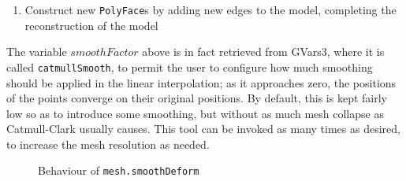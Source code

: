 \documentclass[a4paper,10pt]{article}
\begin{document}
\begin{itemize}
{\begin{enumerate}
\item{Construct new \texttt{PolyFace}s by adding new edges to the model, completing the reconstruction of the model}
\end{enumerate}

The variable $smoothFactor$ above is in fact retrieved from GVars3, where it is called \texttt{catmullSmooth}, to permit the user to configure how much smoothing should be applied in the linear interpolation; as it approaches zero, the positions of the points converge on their original positions. By default, this is kept fairly low so as to introduce some smoothing, but without as much mesh collapse as Catmull-Clark usually causes. This tool can be invoked as many times as desired, to increase the mesh resolution as needed.
}

\begin{figure}
  \begin{center}
  \vspace{-80px}
  \caption{Behaviour of \texttt{mesh.smoothDeform}}
  \label{smoothdef}
  \end{center}
\end{figure}


\end{itemize}
\end{document}
